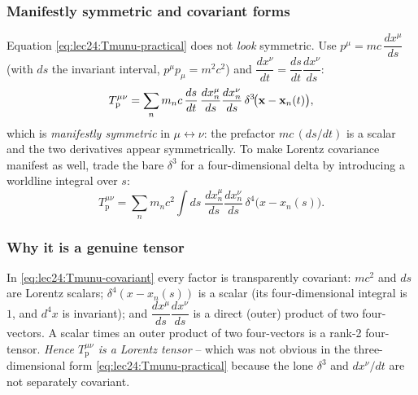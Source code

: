 \subsubsection*{Manifestly symmetric and covariant forms}
Equation \eqref{eq:lec24:Tmunu-practical} does not \emph{look} symmetric. Use
$p^\mu=mc\,\dfrac{dx^\mu}{ds}$ (with $ds$ the invariant interval, $p^\mu p_\mu=m^2c^2$) and
$\dfrac{dx^\nu}{dt}=\dfrac{ds}{dt}\dfrac{dx^\nu}{ds}$:
\begin{equation}\label{eq:lec24:Tmunu-symmetric}
  T^{\mu\nu}_{\text{p}}=\sum_n m_n c\,\frac{ds}{dt}\,
     \frac{dx_n^{\mu}}{ds}\frac{dx_n^{\nu}}{ds}\,
     \delta^3\!\big(\mathbf{x}-\mathbf{x}_n(t)\big),
\end{equation}
which is \emph{manifestly symmetric} in $\mu\leftrightarrow\nu$: the prefactor
$m c\,(ds/dt)$ is a scalar and the two derivatives appear symmetrically. To make Lorentz
covariance manifest as well, trade the bare $\delta^3$ for a four-dimensional delta by
introducing a worldline integral over $s$:
\begin{equation}\label{eq:lec24:Tmunu-covariant}
  \boxed{\;T^{\mu\nu}_{\text{p}}=\sum_n m_n c^2\!\int ds\;
        \frac{dx_n^{\mu}}{ds}\frac{dx_n^{\nu}}{ds}\,
        \delta^4\!\big(x-x_n(s)\big).\;}
\end{equation}


\subsubsection*{Why it is a genuine tensor}
In \eqref{eq:lec24:Tmunu-covariant} every factor is transparently covariant:
$m c^2$ and $ds$ are Lorentz scalars; $\delta^4(x-x_n(s))$ is a scalar (its four-dimensional
integral is $1$, and $d^4x$ is invariant); and $\dfrac{dx^\mu}{ds}\dfrac{dx^\nu}{ds}$ is a
direct (outer) product of two four-vectors. A scalar times an outer product of two
four-vectors is a rank-2 four-tensor. \emph{Hence $T^{\mu\nu}_{\text{p}}$ is a Lorentz
tensor} -- which was not obvious in the three-dimensional form \eqref{eq:lec24:Tmunu-practical}
because the lone $\delta^3$ and $dx^\nu/dt$ are not separately covariant.

